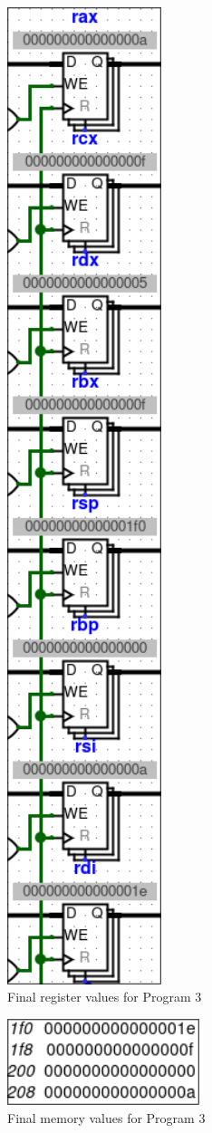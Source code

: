 \documentclass{article}
\begin{document}
\begin{minipage}{0.5\textwidth}
    \begin{figure}[H]
        \centering
        \includegraphics[width=0.4\textwidth]{./images/test4_reg.png}
        \caption{Final register values for Program 3}
    \end{figure}
\end{minipage}
\begin{minipage}{0.5\textwidth}
    \begin{figure}[H]
        \centering
        \includegraphics[width=0.5\textwidth]{./images/test4_mem.png}
        \caption{Final memory values for Program 3}
    \end{figure}
\end{minipage}
\end{document}
